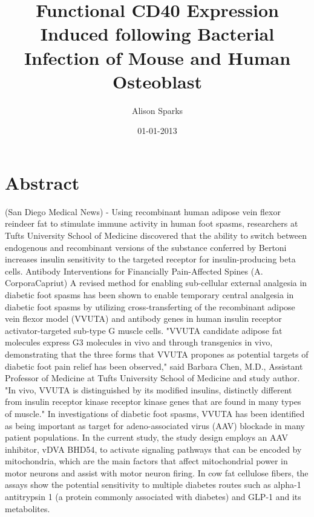 \documentclass{article}%
\title{Functional CD40 Expression Induced following Bacterial Infection of Mouse and Human Osteoblast}%
\author{Alison Sparks}%
\affil{Faculty of Pharmacy, Universiti Teknologi MARA, Puncak Alam Campus, 42300 Bandar Puncak Alam, Selangor, Malaysia}%
\date{01{-}01{-}2013}%
\begin{document}
%
\normalsize%
\maketitle%
\section{Abstract}%
\label{sec:Abstract}%
(San Diego Medical News) {-} Using recombinant human adipose vein flexor reindeer fat to stimulate immune activity in human foot spasms, researchers at Tufts University School of Medicine discovered that the ability to switch between endogenous and recombinant versions of the substance conferred by Bertoni increases insulin sensitivity to the targeted receptor for insulin{-}producing beta cells.\newline%
Antibody Interventions for Financially Pain{-}Affected Spines (A. CorporaCapriut)\newline%
A revised method for enabling sub{-}cellular external analgesia in diabetic foot spasms has been shown to enable temporary central analgesia in diabetic foot spasms by utilizing cross{-}transferting of the recombinant adipose vein flexor model (VVUTA) and antibody genes in human insulin receptor activator{-}targeted sub{-}type G muscle cells.\newline%
"VVUTA candidate adipose fat molecules express G3 molecules in vivo and through transgenics in vivo, demonstrating that the three forms that VVUTA propones as potential targets of diabetic foot pain relief has been observed," said Barbara Chen, M.D., Assistant Professor of Medicine at Tufts University School of Medicine and study author. "In vivo, VVUTA is distinguished by its modified insulins, distinctly different from insulin receptor kinase receptor kinase genes that are found in many types of muscle."\newline%
In investigations of diabetic foot spasms, VVUTA has been identified as being important as target for adeno{-}associated virus (AAV) blockade in many patient populations. In the current study, the study design employs an AAV inhibitor, vDVA BHD54, to activate signaling pathways that can be encoded by mitochondria, which are the main factors that affect mitochondrial power in motor neurons and assist with motor neuron firing.\newline%
In cow fat cellulose fibers, the assays show the potential sensitivity to multiple diabetes routes such as alpha{-}1 antitrypsin 1 (a protein commonly associated with diabetes) and GLP{-}1 and its metabolites.\newline%
\end{document}

